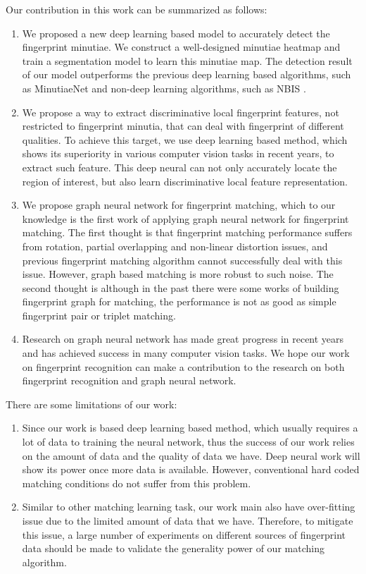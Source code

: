 Our contribution in this work can be summarized as follows:

\begin{enumerate}
    \item We proposed a new deep learning based model to accurately detect the fingerprint minutiae. We construct a well-designed minutiae heatmap and train a segmentation model to learn this minutiae map. The detection result of our model outperforms the previous deep learning based algorithms, such as MinutiaeNet \cite{NguyenICB2018} and non-deep learning algorithms, such as NBIS \cite{NBIS}.
    \item We propose a way to extract discriminative local fingerprint features, not restricted to fingerprint minutia, that can deal with fingerprint of different qualities. To achieve this target, we use deep learning based method, which shows its superiority in various computer vision tasks in recent years, to extract such feature. This deep neural can not only accurately locate the region of interest, but also learn discriminative local feature representation. 
    \item We propose graph neural network for fingerprint matching, which to our knowledge is the first work of applying graph neural network for fingerprint matching. The first thought is that fingerprint matching performance suffers from rotation, partial overlapping and non-linear distortion issues, and previous fingerprint matching algorithm cannot successfully deal with this issue. However, graph based matching is more robust to such noise. The second thought is although in the past there were some works of building fingerprint graph for matching, the performance is not as good as simple fingerprint pair or triplet matching.
    \item Research on graph neural network has made great progress in recent years and has achieved success in many computer vision tasks. We hope our work on fingerprint recognition can make a contribution to the research on both fingerprint recognition and graph neural network.
\end{enumerate}

There are some limitations of our work:
\begin{enumerate}
    \item Since our work is based deep learning based method, which usually requires a lot of data to training the neural network, thus the success of our work relies on the amount of data and the quality of data we have. Deep neural work will show its power once more data is available. However, conventional hard coded matching conditions do not suffer from this problem.
    \item Similar to other matching learning task, our work main also have over-fitting issue due to the limited amount of data that we have. Therefore, to mitigate this issue, a large number of experiments on different sources of fingerprint data should be made to validate the generality power of our matching algorithm.
\end{enumerate}

